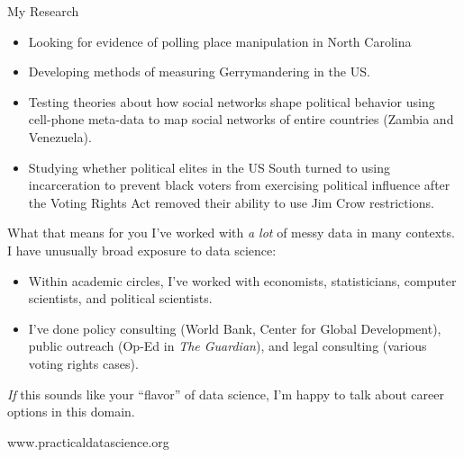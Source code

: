 \documentclass[11pt]{beamer}
\begin{document}
\begin{frame}[c]{My Research}
	\begin{itemize}
		\pause \item Looking for evidence of polling place manipulation in North Carolina
		\pause \item Developing methods of measuring Gerrymandering in the US.
		\pause \item Testing theories about how social networks shape political behavior using cell-phone meta-data to map social networks of entire countries (Zambia and Venezuela).
		\pause \item Studying whether political elites in the US South turned to using incarceration to prevent black voters from exercising political influence after the Voting Rights Act removed their ability to use Jim Crow restrictions.
	\end{itemize}
\end{frame}

\begin{frame}[c]{What that means for you}
\pause I've worked with \emph{a lot} of messy data in many contexts. \\
\pause I have unusually broad exposure to data science:
\begin{itemize}
	\pause \item Within academic circles, I've worked with economists, statisticians, computer scientists, and political scientists.
	\pause \item I've done \alert{policy consulting} (World Bank, Center for Global Development), \alert{public outreach} (Op-Ed in \emph{The Guardian}), and \alert{legal consulting} (various voting rights cases).
\end{itemize}
\pause \emph{If} this sounds like your ``flavor'' of data science, I'm happy to talk about career options in this domain.
\end{frame}

\begin{frame}[c]{}
	\begin{center}
www.practicaldatascience.org
	\end{center}
\end{frame}
\end{document}
